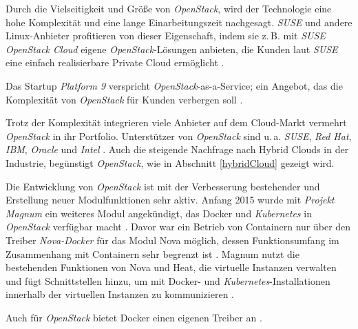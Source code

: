 \documentclass[../main.tex]{subfiles}
\begin{document}
      Durch die Vielseitigkeit und Größe von \emph{OpenStack}, wird der Technologie eine hohe Komplexität und eine lange Einarbeitungszeit nachgesagt. \emph{SUSE} und andere Linux-Anbieter profitieren von dieser Eigenschaft, indem sie z.\,B. mit \emph{SUSE OpenStack Cloud} eigene \emph{OpenStack}-Lösungen anbieten, die Kunden laut \emph{SUSE} eine einfach realisierbare Private Cloud ermöglicht \cite{SusePrivateCloud}\cite[S.2,4]{golemOpenStack}.

      Das Startup \emph{Platform 9} verspricht \emph{OpenStack}-as-a-Service; ein Angebot, das die Komplexität von \emph{OpenStack} für Kunden verbergen soll \cite{platform9}.

      Trotz der Komplexität integrieren viele Anbieter auf dem Cloud-Markt vermehrt \emph{OpenStack} in ihr Portfolio. Unterstützer von \emph{OpenStack} sind u.\,a. \emph{SUSE}, \emph{Red Hat}, \emph{IBM}, \emph{Oracle} und \emph{Intel} \cite{heiseOpenStack}\cite{IBMDockerOpenStack}. Auch die steigende Nachfrage nach Hybrid Clouds in der Industrie, begünstigt \emph{OpenStack}, wie in Abschnitt \ref{hybridCloud} gezeigt wird.

      Die Entwicklung von \emph{OpenStack} ist mit der Verbesserung bestehender und Erstellung neuer Modulfunktionen sehr aktiv. Anfang 2015 wurde mit \emph{Projekt Magnum} ein weiteres Modul angekündigt, das Docker und \emph{Kubernetes} in \emph{OpenStack} verfügbar macht \cite{openStackMagnum}. Davor war ein Betrieb von Containern nur über den Treiber \emph{Nova-Docker} für das Modul Nova möglich, dessen Funktionsumfang im Zusammenhang mit Containern sehr begrenzt ist \cite{heiseOpenStackContainer}\cite{openStackDocker}.
      Magnum nutzt die bestehenden Funktionen von Nova und Heat, die virtuelle Instanzen verwalten und fügt Schnittstellen hinzu, um mit Docker- und \emph{Kubernetes}-Installationen innerhalb der virtuellen Instanzen zu kommunizieren \cite{openStackMagnum}.


      Auch für \emph{OpenStack} bietet Docker einen eigenen Treiber an \cite{dockerMachineDriverOpenStack}.

\end{document}
